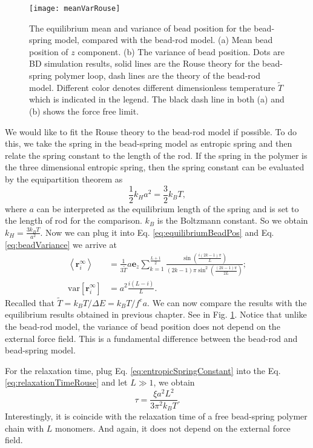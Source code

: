 \begin{figure}[htpb]
    \centering
    \texttt{[image: meanVarRouse]}
    \caption{The equilibrium mean and variance of bead position for the bead-spring model, compared with the bead-rod model. (a) Mean bead position of $z$ component. (b) The variance of bead position. Dots are BD simulation results, solid lines are the Rouse theory for the bead-spring polymer loop, dash lines are the theory of the bead-rod model. Different color denotes different dimensionless temperature $\tilde{T}$ which is indicated in the legend. The black dash line in both (a) and (b) shows the force free limit. }
    \label{fig:meanVarRouse}
\end{figure}
We would like to fit the Rouse theory to the bead-rod model if possible. To do this, we take the spring in the bead-spring model as entropic spring and then relate the spring constant to the length of the rod. If the spring in the polymer is the three dimensional entropic spring, then the spring constant can be evaluated by the equipartition theorem as
\begin{equation}
    \label{eq:entropicSpringConstant}
    \frac{1}{2} k_H a^2 = \frac{3}{2} k_B T,
\end{equation}
where $a$ can be interpreted as the equilibrium length of the spring and is set to the length of rod for the comparison. $k_B$ is the Boltzmann constant. So we obtain $k_H = \frac{3k_B T}{a^2}$. Now we can plug it into Eq. \eqref{eq:equilibriumBeadPos} and Eq. \eqref{eq:beadVariance} we arrive at
\begin{subequations}
    \label{eq:beadspringMeanVar}
    \begin{align}
    \left<\mathbf{r}_i^\infty\right> & = 
    \frac{1}{3\tilde{T}}a\mathbf{e}_z \sum_{k=1}^{\frac{L+1}{2}}\frac{\sin\left(\frac{i(2k-1)\pi}{L}\right)} {(2k-1)\pi\sin^2\left(\frac{(2k-1)\pi}{2L}\right)}; \\
    \text{var}\left[\mathbf{r}_i^{\infty}\right] & = a^2\frac{i(L-i)}{L}.
    \end{align}
\end{subequations}
Recalled that $\tilde{T} = k_B T / \Delta E = k_B T / f^e a$. We can now compare the results with the equilibrium results obtained in previous chapter. See in Fig. \ref{fig:meanVarRouse}. Notice that unlike the bead-rod model, the variance of bead position does not depend on the external force field. This is a fundamental difference between the bead-rod and bead-spring model.

For the relaxation time, plug Eq. \eqref{eq:entropicSpringConstant} into the Eq. \eqref{eq:relaxationTimeRouse} and let $L\gg 1$, we obtain
\begin{equation}
    \label{eq:relaxationTimeRouseRod}
    \tau = \frac{\xi a^2 L^2}{3 \pi^2 k_B T}. 
\end{equation}
Interestingly, it is coincide with the relaxation time of a free bead-spring polymer chain with $L$ monomers. And again, it does not depend on the external force field. 

